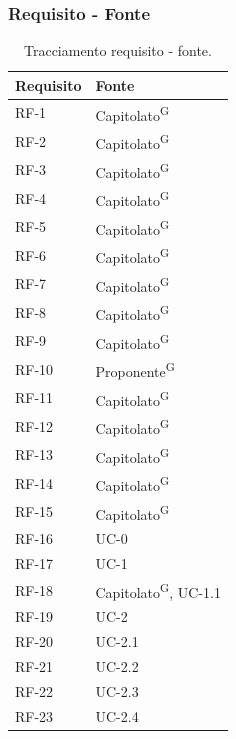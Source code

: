 \documentclass[8pt]{article}
\newcommand{\glossterm}[1]{#1\textsuperscript{G}} %
\begin{document}
\subsubsection{Requisito - Fonte}
\begin{longtable}{|>{\centering\arraybackslash}p{4cm}|>{\centering\arraybackslash}p{4cm}|}
		\hline
  \rowcolor{white}
		\textbf{Requisito} & \textbf{Fonte} \\
		\hline
  \endfirsthead
  \rowcolor{white}
  \caption{Tracciamento requisito - fonte.}
	\label{table:Tracciamento requisito - fonte}
 \endlastfoot
            RF-1 & \glossterm{Capitolato} \\ \hline
            RF-2 & \glossterm{Capitolato} \\ \hline
            RF-3 & \glossterm{Capitolato} \\ \hline
            RF-4 & \glossterm{Capitolato} \\ \hline
            RF-5 & \glossterm{Capitolato} \\ \hline
            RF-6 & \glossterm{Capitolato} \\ \hline
            RF-7 & \glossterm{Capitolato} \\ \hline
            RF-8 & \glossterm{Capitolato} \\ \hline
            RF-9 & \glossterm{Capitolato} \\ \hline
            RF-10 & \glossterm{Proponente} \\ \hline
            RF-11 & \glossterm{Capitolato} \\ \hline
            RF-12 & \glossterm{Capitolato} \\ \hline
            RF-13 & \glossterm{Capitolato} \\ \hline
            RF-14 & \glossterm{Capitolato} \\ \hline
            RF-15 & \glossterm{Capitolato} \\ \hline
            RF-16 & UC-0 \\ \hline
            RF-17 & UC-1 \\ \hline
            RF-18 & \glossterm{Capitolato}, UC-1.1 \\ \hline
            RF-19 & UC-2 \\ \hline
            RF-20 & UC-2.1 \\ \hline
            RF-21 & UC-2.2 \\ \hline
            RF-22 & UC-2.3 \\ \hline
            RF-23 & UC-2.4 \\ \hline

\end{longtable}
\end{document}
